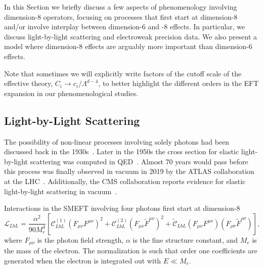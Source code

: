 In this Section we briefly discuss a few aspects of phenomenology involving dimension-8 operators, focusing on processes that first start at dimension-8 and/or involve interplay between dimension-6 and -8 effects.
In particular, we discuss light-by-light scattering and electroweak precision data.
We also present a model where dimension-8 effects are arguably more important than dimension-6 effects.

Note that sometimes we will explicitly write factors of the cutoff scale of the effective theory, $C_i \to c_i / \Lambda^{d-4}$, to better highlight the different orders in the EFT expansion in our phenomenological studies.

\subsection{Light-by-Light Scattering}

The possibility of non-linear processes involving solely photons had been discussed back in the 1930s~\cite{Halpern:1933dya, Euler:1935zz, Heisenberg:1935qt, Euler:1936oxn}.
Later in the 1950s the cross section for elastic light-by-light scattering was computed in QED~\cite{Karplus:1950zza, Karplus:1950zz}.
Almost 70 years would pass before this process was finally observed in vacuum in 2019 by the ATLAS collaboration at the LHC~\cite{Aad:2019ock}.
Additionally, the CMS collaboration reports evidence for elastic light-by-light scattering in vacuum~\cite{Sirunyan:2018fhl}.

Interactions in the SMEFT involving four photons first start at dimension-8
\begin{equation}
\label{eq:lbl}
\mathcal{L}_{LbL} = \frac{\alpha^2}{90 M_e^4} \left[ \mathscr{C}_{LbL}^{(1)} \left(F_{\mu\nu} F^{\mu\nu}\right)^2 + \mathscr{C}_{LbL}^{(2)} \left(F_{\mu\nu} \widetilde F^{\mu\nu}\right)^2 + \widetilde{\mathscr{C}}_{LbL} \left(F_{\mu\nu} F^{\mu\nu}\right) \left(F_{\rho\sigma} \widetilde F^{\rho\sigma}\right) \right] ,
\end{equation}
where $F_{\mu\nu}$ is the photon field strength, $\alpha$ is the fine structure constant, and $M_e$ is the mass of the electron.
The normalization is such that order one coefficients are generated when the electron is integrated out with $E \ll M_e$.

